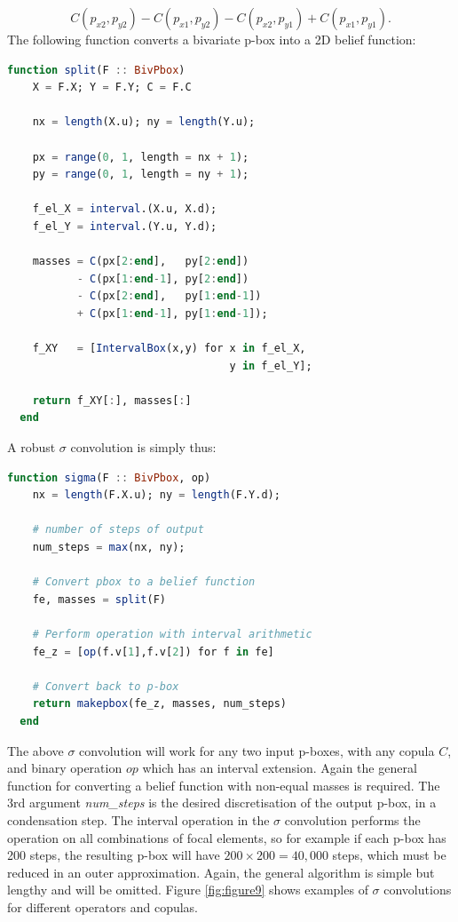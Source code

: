 \documentclass{juliacon}
\begin{document}
\begin{equation*}
  C(p_{x2}, p_{y2}) - C(p_{x1}, p_{y2}) - C(p_{x2}, p_{y1}) + C(p_{x1}, p_{y1}) .
\end{equation*}
The following function converts a bivariate p-box into a 2D belief function: 

\begin{lstlisting}[language = Julia]
  function split(F :: BivPbox)
    X = F.X; Y = F.Y; C = F.C
    
    nx = length(X.u); ny = length(Y.u);

    px = range(0, 1, length = nx + 1);
    py = range(0, 1, length = ny + 1);

    f_el_X = interval.(X.u, X.d);
    f_el_Y = interval.(Y.u, Y.d);
    
    masses = C(px[2:end],   py[2:end]) 
           - C(px[1:end-1], py[2:end]) 
           - C(px[2:end],   py[1:end-1]) 
           + C(px[1:end-1], py[1:end-1]);

    f_XY   = [IntervalBox(x,y) for x in f_el_X, 
                                   y in f_el_Y];

    return f_XY[:], masses[:]
  end
\end{lstlisting}

A robust $\sigma$ convolution is simply thus: 

\begin{lstlisting}[language = Julia]
  function sigma(F :: BivPbox, op)
    nx = length(F.X.u); ny = length(F.Y.d);

    # number of steps of output
    num_steps = max(nx, ny);
    
    # Convert pbox to a belief function
    fe, masses = split(F)

    # Perform operation with interval arithmetic
    fe_z = [op(f.v[1],f.v[2]) for f in fe]
    
    # Convert back to p-box
    return makepbox(fe_z, masses, num_steps)
  end
\end{lstlisting}

The above $\sigma$ convolution will work for any two input p-boxes, with any copula $C$, and binary operation $op$ which has an interval extension. Again the general function for converting a belief function with non-equal masses is required. The 3rd argument \textit{num\_steps} is the desired discretisation of the output p-box, in a condensation step. The interval operation in the $\sigma$ convolution performs the operation on all combinations of focal elements, so for example if each p-box has 200 steps, the resulting p-box will have $200 \times 200 = 40,000$ steps, which must be reduced in an outer approximation. Again, the general algorithm is simple but lengthy and will be omitted. Figure \ref{fig:figure9} shows examples of $\sigma$ convolutions for different operators and copulas.
\iffalse
\end{document}
